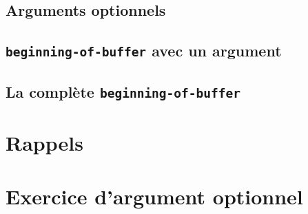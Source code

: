 \subsection{Arguments optionnels}

\subsection{\texttt{beginning-of-buffer} avec un
  argument}

\subsection{La complète \texttt{beginning-of-buffer}}

\section{Rappels}

\section{Exercice d'argument optionnel}